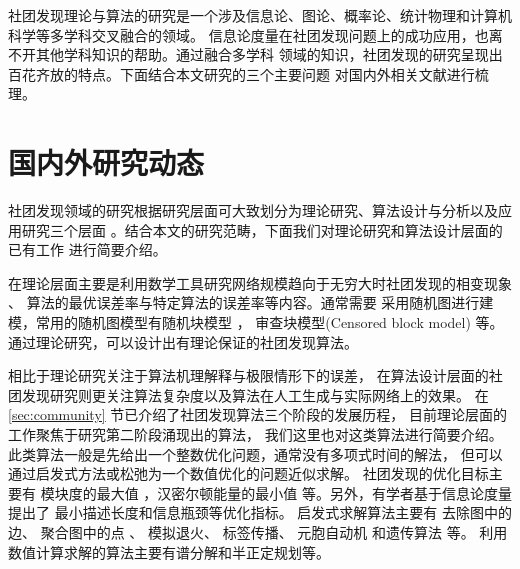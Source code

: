 社团发现理论与算法的研究是一个涉及信息论、图论、概率论、统计物理和计算机科学等多学科交叉融合的领域。
信息论度量在社团发现问题上的成功应用，也离不开其他学科知识的帮助。通过融合多学科
领域的知识，社团发现的研究呈现出百花齐放的特点。下面结合本文研究的三个主要问题
对国内外相关文献进行梳理。

\section{国内外研究动态}

社团发现领域的研究根据研究层面可大致划分为理论研究、算法设计与分析以及应用研究三个层面
\cite{ZJSH201102017}。结合本文的研究范畴，下面我们对理论研究和算法设计层面的已有工作
进行简要介绍。


在理论层面主要是利用数学工具研究网络规模趋向于无穷大时社团发现的相变现象
\cite{lenka2016physics}、
算法的最优误差率与特定算法的误差率等内容。通常需要
采用随机图进行建模，常用的随机图模型有随机块模型
\cite{holland1983stochastic}，
审查块模型(Censored block model) \cite{hajek2015censored}等。
通过理论研究，可以设计出有理论保证的社团发现算法。%


相比于理论研究关注于算法机理解释与极限情形下的误差，
在算法设计层面的社团发现研究则更关注算法复杂度以及算法在人工生成与实际网络上的效果。
在 \ref{sec:community} 节已介绍了社团发现算法三个阶段的发展历程，
目前理论层面的工作聚焦于研究第二阶段涌现出的算法，
我们这里也对这类算法进行简要介绍。
此类算法一般是先给出一个整数优化问题，通常没有多项式时间的解法，
但可以通过启发式方法或松弛为一个数值优化的问题近似求解。
社团发现的优化目标主要有
模块度的最大值 \cite{newman2006modularity}，汉密尔顿能量的最小值
\cite{reichardt2004potts} 等。另外，有学者基于信息论度量提出了
最小描述长度\cite{rosvall2007information}和信息瓶颈\cite{ziv2005bottleneck}等优化指标。
启发式求解算法主要有
去除图中的边\cite{girvan2002community}、
聚合图中的点 \cite{clauset2004finding}、
模拟退火\cite{massen2005annealing}、
标签传播\cite{raghavan2007near}、
元胞自动机\cite{chen2008automata}
和遗传算法 \cite{pizzuti2008ga, zhu2009genetic}等。
利用数值计算求解的算法主要有谱分解\cite{coja-oghlan_2010}和半正定规划\cite{chen2012sdp}等。

